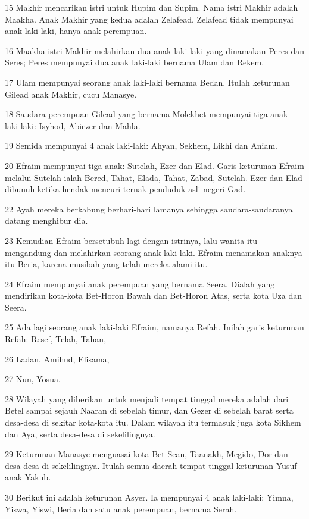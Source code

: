 \par 15 Makhir mencarikan istri untuk Hupim dan Supim. Nama istri Makhir adalah Maakha. Anak Makhir yang kedua adalah Zelafead. Zelafead tidak mempunyai anak laki-laki, hanya anak perempuan.
\par 16 Maakha istri Makhir melahirkan dua anak laki-laki yang dinamakan Peres dan Seres; Peres mempunyai dua anak laki-laki bernama Ulam dan Rekem.
\par 17 Ulam mempunyai seorang anak laki-laki bernama Bedan. Itulah keturunan Gilead anak Makhir, cucu Manasye.
\par 18 Saudara perempuan Gilead yang bernama Molekhet mempunyai tiga anak laki-laki: Isyhod, Abiezer dan Mahla.
\par 19 Semida mempunyai 4 anak laki-laki: Ahyan, Sekhem, Likhi dan Aniam.
\par 20 Efraim mempunyai tiga anak: Sutelah, Ezer dan Elad. Garis keturunan Efraim melalui Sutelah ialah Bered, Tahat, Elada, Tahat, Zabad, Sutelah. Ezer dan Elad dibunuh ketika hendak mencuri ternak penduduk asli negeri Gad.
\par 22 Ayah mereka berkabung berhari-hari lamanya sehingga saudara-saudaranya datang menghibur dia.
\par 23 Kemudian Efraim bersetubuh lagi dengan istrinya, lalu wanita itu mengandung dan melahirkan seorang anak laki-laki. Efraim menamakan anaknya itu Beria, karena musibah yang telah mereka alami itu.
\par 24 Efraim mempunyai anak perempuan yang bernama Seera. Dialah yang mendirikan kota-kota Bet-Horon Bawah dan Bet-Horon Atas, serta kota Uza dan Seera.
\par 25 Ada lagi seorang anak laki-laki Efraim, namanya Refah. Inilah garis keturunan Refah: Resef, Telah, Tahan,
\par 26 Ladan, Amihud, Elisama,
\par 27 Nun, Yosua.
\par 28 Wilayah yang diberikan untuk menjadi tempat tinggal mereka adalah dari Betel sampai sejauh Naaran di sebelah timur, dan Gezer di sebelah barat serta desa-desa di sekitar kota-kota itu. Dalam wilayah itu termasuk juga kota Sikhem dan Aya, serta desa-desa di sekelilingnya.
\par 29 Keturunan Manasye menguasai kota Bet-Sean, Taanakh, Megido, Dor dan desa-desa di sekelilingnya. Itulah semua daerah tempat tinggal keturunan Yusuf anak Yakub.
\par 30 Berikut ini adalah keturunan Asyer. Ia mempunyai 4 anak laki-laki: Yimna, Yiswa, Yiswi, Beria dan satu anak perempuan, bernama Serah.
